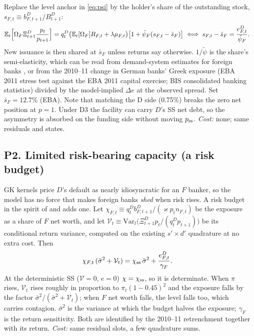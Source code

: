 \documentclass[11pt]{article}
\newcommand{\E}{\mathbb{E}}
\begin{document}
Replace the level anchor in \eqref{eq:psi} by the holder's share of the outstanding stock,
$s_{F,t}\equiv b^D_{F,t+1}/B^D_{t+1}$:
\begin{equation}
\E_t\Bigl[\Omega_F\Xi^D_{t+1}\frac{p_t}{p_{t+1}}\Bigr]
=q^D_t\bigl(\E_t[\Omega_F]R_{F,t}+\lambda\mu_{F,t}\bigr)\bigl[1+\tilde\psi_F(s_{F,t}-\bar s_F)\bigr]
\iff s_{F,t}-\bar s_F=\frac{e^D_{F,t}}{\tilde\psi_F}.
\end{equation}
New issuance is then shared at $\bar s_F$ unless returns say otherwise. $1/\tilde\psi$ is the
share's semi-elasticity, which can be read from demand-system estimates for foreign banks
\citep{koijen2021inspecting}, or from the 2010--11 change in German banks' Greek exposure (EBA
2011 stress test against the EBA 2011 capital exercise; BIS consolidated banking statistics)
divided by the model-implied $\Delta e$ at the observed spread. Set $\bar s_F=12.7\%$ (EBA). Note
that matching the D side (0.75\%) breaks the zero net position at $p=1$. Under D3 the facility
can carry $D$'s SS net debt, so the asymmetry is absorbed on the funding side without moving
$p_{\rm ss}$. \emph{Cost:} none; same residuals and states.

\subsection*{P2. Limited risk-bearing capacity (a risk budget)}

GK kernels price $D$'s default as nearly idiosyncratic for an $F$ banker, so the model has no
force that makes foreign banks \emph{shed} when risk rises. A risk budget in the spirit of
\citet{adrian2014procyclical} and \citet{gabaix2015international} adds one. Let
$\chi_{F,t}\equiv q^D_tb^D_{F,t+1}/(\varkappa p_tn_{F,t})$ be the exposure as a share of $F$ net
worth, and let $\mathcal V_t\equiv\mathrm{Var}_t\bigl(\Xi^D_{t+1}p_t/(q^D_tp_{t+1})\bigr)$ be its
conditional return variance, computed on the existing $s'\times d'$ quadrature at no extra cost.
Then
\begin{equation}
\chi_{F,t}\,(\bar\sigma^2+\mathcal V_t)=\chi_{\rm ss}\,\bar\sigma^2+\frac{e^D_{F,t}}{\gamma_F}.
\label{eq:p2}
\end{equation}
At the deterministic SS ($\mathcal V=0$, $e=0$) $\chi=\chi_{\rm ss}$, so it is determinate. When
$\pi$ rises, $\mathcal V_t$ rises roughly in proportion to $\pi_t(1-0.45)^2$ and the exposure
falls by the factor $\bar\sigma^2/(\bar\sigma^2+\mathcal V_t)$; when $F$ net worth falls, the
level falls too, which carries contagion. $\bar\sigma^2$ is the variance at which the budget
halves the exposure; $\gamma_F$ is the return sensitivity. Both are identified by the
2010--11 retrenchment together with its return. \emph{Cost:} same residual slots, a few
quadrature sums.
\end{document}
